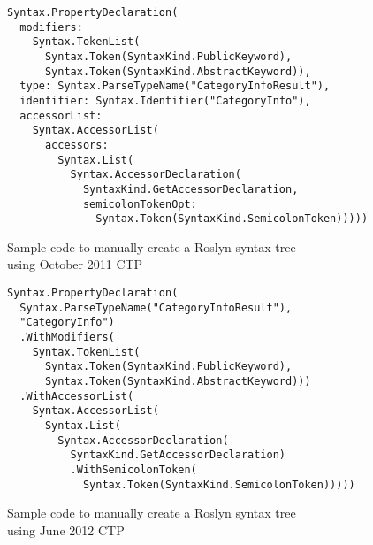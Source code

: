 \begin{figure}[p]

\begin{lstlisting}
Syntax.PropertyDeclaration(
  modifiers:
    Syntax.TokenList(
      Syntax.Token(SyntaxKind.PublicKeyword),
      Syntax.Token(SyntaxKind.AbstractKeyword)),
  type: Syntax.ParseTypeName("CategoryInfoResult"),
  identifier: Syntax.Identifier("CategoryInfo"),
  accessorList:
    Syntax.AccessorList(
      accessors:
        Syntax.List(
          Syntax.AccessorDeclaration(
            SyntaxKind.GetAccessorDeclaration,
            semicolonTokenOpt:
              Syntax.Token(SyntaxKind.SemicolonToken)))))
\end{lstlisting}

\caption{Sample code to manually create a Roslyn syntax tree \\ using October 2011 CTP}
\label{Roslyn code 2011}
\end{figure}

\begin{figure}[p]

\begin{lstlisting}
Syntax.PropertyDeclaration(
  Syntax.ParseTypeName("CategoryInfoResult"),
  "CategoryInfo")
  .WithModifiers(
    Syntax.TokenList(
      Syntax.Token(SyntaxKind.PublicKeyword),
      Syntax.Token(SyntaxKind.AbstractKeyword)))
  .WithAccessorList(
    Syntax.AccessorList(
      Syntax.List(
        Syntax.AccessorDeclaration(
          SyntaxKind.GetAccessorDeclaration)
          .WithSemicolonToken(
            Syntax.Token(SyntaxKind.SemicolonToken)))))
\end{lstlisting}

\caption{Sample code to manually create a Roslyn syntax tree \\ using June 2012 CTP}
\label{Roslyn code 2012}
\end{figure}